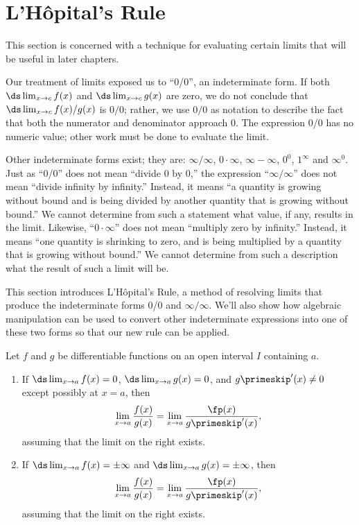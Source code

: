 \section{L'Hôpital's Rule}\label{sec:lhopitals_rule}

This section is concerned with a technique for evaluating certain limits that will be useful in later chapters.

Our treatment of limits exposed us to ``0/0'', an indeterminate form. If both $\ds \lim_{x\to c}f(x)$ and $\ds \lim_{x\to c} g(x)$ are zero, we do not conclude that $\ds \lim_{x\to c} f(x)/g(x)$ is $0/0$; rather, we use $0/0$ as notation to describe the fact that both the numerator and denominator approach 0. The expression 0/0 has no numeric value; other work must be done to evaluate the limit.

Other indeterminate forms exist; they are: $\infty/\infty$, $0\cdot\infty$, $\infty-\infty$, $0^0$, $1^\infty$ and $\infty^0$. Just as ``0/0'' does not mean ``divide 0 by 0,'' the expression ``$\infty/\infty$'' does not mean ``divide infinity by infinity.'' Instead, it means ``a quantity is growing without bound and is being divided by another quantity that is growing without bound.'' We cannot determine from such a statement what value, if any, results in the limit. Likewise, ``$0\cdot \infty$'' does not mean ``multiply zero by infinity.'' Instead, it means ``one quantity is shrinking to zero, and is being multiplied by a quantity that is growing without bound.'' We cannot determine from such a description what the result of such a limit will be.

This section introduces L'Hôpital's Rule, a method of resolving limits that produce the indeterminate forms 0/0 and $\infty/\infty$. We'll also show how algebraic manipulation can be used to convert other indeterminate expressions into one of these two forms so that our new rule can be applied.

\begin{theorem}\label{thm:LHR_1}%
Let $f$ and $g$ be differentiable functions on an open interval $I$ containing $a$.
\begin{enumerate}
\item If $\ds\lim_{x\to a}f(x)=0$, $\ds\lim_{x\to a}g(x)=0$, and $g\primeskip'(x)\neq 0$ except possibly at $x=a$, then \[\lim_{x\to a}\frac{f(x)}{g(x)}=\lim_{x\to a} \frac{\fp(x)}{g\primeskip'(x)},\]
assuming that the limit on the right exists.
\item If  $\ds\lim_{x\to a}f(x)=\pm\infty$ and $\ds\lim_{x\to a}g(x)=\pm\infty$, then \[\lim_{x\to a}\frac{f(x)}{g(x)}=\lim_{x\to a} \frac{\fp(x)}{g\primeskip'(x)},\]
assuming that the limit on the right exists.
\end{enumerate}
\end{theorem}

